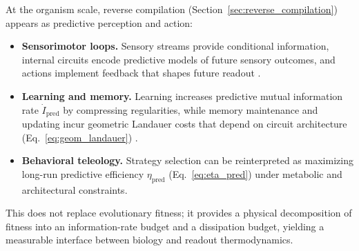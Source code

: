 At the organism scale, reverse compilation (Section~\ref{sec:reverse_compilation}) appears as predictive perception and action:
\begin{itemize}
  \item \textbf{Sensorimotor loops.}
  Sensory streams provide conditional information, internal circuits encode predictive models of future sensory outcomes, and actions implement feedback that shapes future readout \cite{RaoBallard1999,Friston2010}.
  \item \textbf{Learning and memory.}
  Learning increases predictive mutual information rate $\dot I_{\mathrm{pred}}$ by compressing regularities, while memory maintenance and updating incur geometric Landauer costs that depend on circuit architecture (Eq.~\eqref{eq:geom_landauer}) \cite{Friston2010}.
  \item \textbf{Behavioral teleology.}
  Strategy selection can be reinterpreted as maximizing long-run predictive efficiency $\eta_{\mathrm{pred}}$ (Eq.~\eqref{eq:eta_pred}) under metabolic and architectural constraints.
\end{itemize}
This does not replace evolutionary fitness; it provides a physical decomposition of fitness into an information-rate budget and a dissipation budget, yielding a measurable interface between biology and readout thermodynamics.



